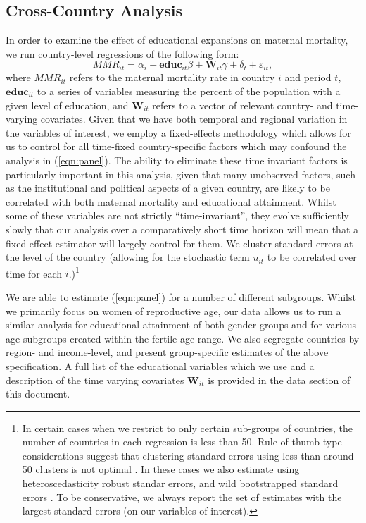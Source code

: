 \documentclass{article}[12pt,subeqn]
\begin{document}
\begin{spacing}{1.4}
\subsection{Cross-Country Analysis}
In order to examine the effect of educational expansions on maternal mortality, 
we run country-level regressions of the following form:
\begin{equation}
\label{eqn:panel}
   MMR_{it}=\alpha_i+\mathbf{educ}_{it}\beta + \mathbf{W}_{it}\gamma+\delta_t+
   \varepsilon_{it},
\end{equation}
where $MMR_{it}$ refers to the maternal mortality rate in country $i$ and period 
$t$, $\mathbf{educ}_{it}$ to a series of variables measuring the percent of the 
population with a given level of education, and $\mathbf{W}_{it}$ refers to a 
vector of relevant country- and time-varying covariates.  Given that we have both 
temporal and regional variation in the variables of interest, we employ a 
fixed-effects methodology which allows for us to control for all time-fixed 
country-specific factors which may confound the analysis in (\ref{eqn:panel}).
The ability to eliminate these time invariant factors is particularly important 
in this analysis, given that many unobserved factors, such as the institutional 
and political aspects of a given country, are likely to be correlated with both 
maternal mortality and educational attainment. Whilst some of these variables are 
not strictly ``time-invariant'', they evolve sufficiently slowly that our analysis 
over a comparatively short time horizon will mean that a fixed-effect estimator 
will largely control for them. We cluster standard errors at the level of the 
country (allowing for the stochastic term $u_{it}$ to be correlated over time for 
each $i$.)\footnote{In certain cases when we restrict to only certain sub-groups
of countries, the number of countries in each regression is less than 50.  Rule
of thumb-type considerations suggest that clustering standard errors using less
than around 50 clusters is not optimal \citep{AngristPischke2009,NicholsSchaffer2007}.  
In these cases we also estimate using heteroscedasticity robust standar errors, 
and wild bootstrapped standard errors \citep{MackinnonWebb2014,CameronMiller2015}. 
To be conservative, we always report the set of estimates with the largest 
standard errors (on our variables of interest).}

We are able to estimate (\ref{eqn:panel}) for a number of different subgroups. 
Whilst we primarily focus on women of reproductive age, our data allows us to run 
a similar analysis for educational attainment of both gender groups and for 
various age subgroups created within the fertile age range. We also segregate 
countries by region- and income-level, and present group-specific estimates of the 
above specification. A full list of the educational variables which we use and a 
description of the time varying covariates $\textbf{W}_{it}$ is provided in the 
data section of this document.


\end{spacing}
\end{document}
